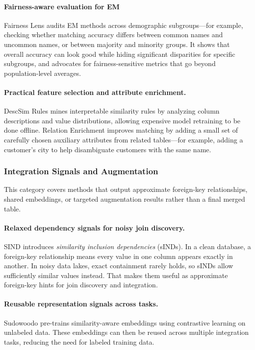 \documentclass[sigconf]{acmart}
\begin{document}
\paragraph{Fairness-aware evaluation for EM}
Fairness Lens audits EM methods across demographic subgroups---for example, checking whether matching accuracy differs between common names and uncommon names, or between majority and minority groups. It shows that overall accuracy can look good while hiding significant disparities for specific subgroups, and advocates for fairness-sensitive metrics that go beyond population-level averages.

\paragraph{Practical feature selection and attribute enrichment.}
DescSim Rules mines interpretable similarity rules by analyzing column descriptions and value distributions, allowing expensive model retraining to be done offline. Relation Enrichment improves matching by adding a small set of carefully chosen auxiliary attributes from related tables---for example, adding a customer's city to help disambiguate customers with the same name.


\subsubsection{Integration Signals and Augmentation}
\label{sec:integration-signals}

This category covers methods that output approximate foreign-key relationships, shared embeddings, or targeted augmentation results rather than a final merged table.

\paragraph{Relaxed dependency signals for noisy join discovery.}
SIND introduces \emph{similarity inclusion dependencies} (sINDs). In a clean database, a foreign-key relationship means every value in one column appears exactly in another. In noisy data lakes, exact containment rarely holds, so sINDs allow sufficiently similar values instead. That makes them useful as approximate foreign-key hints for join discovery and integration.

\paragraph{Reusable representation signals across tasks.}
Sudowoodo pre-trains similarity-aware embeddings using contrastive learning on unlabeled data. These embeddings can then be reused across multiple integration tasks, reducing the need for labeled training data.
\end{document}
